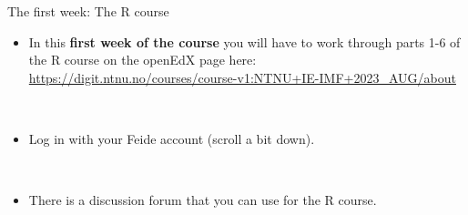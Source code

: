 \documentclass[
  10pt,
  ignorenonframetext,
]{beamer}
\providecommand{\tightlist}{%
  \setlength{\itemsep}{0pt}\setlength{\parskip}{0pt}}
\begin{document}
\begin{frame}
\begin{block}{The first week: The R course}
\protect\hypertarget{the-first-week-the-r-course}{}
\(~\)

\begin{itemize}
\tightlist
\item
  In this \textbf{first week of the course} you will have to work
  through parts 1-6 of the R course on the openEdX page here:
  \url{https://digit.ntnu.no/courses/course-v1:NTNU+IE-IMF+2023_AUG/about}
\end{itemize}

\(~\)

\begin{itemize}
\tightlist
\item
  Log in with your Feide account (scroll a bit down).
\end{itemize}

\(~\)

\begin{itemize}
\tightlist
\item
  There is a discussion forum that you can use for the R course.
\end{itemize}
\end{block}
\end{frame}
\end{document}
